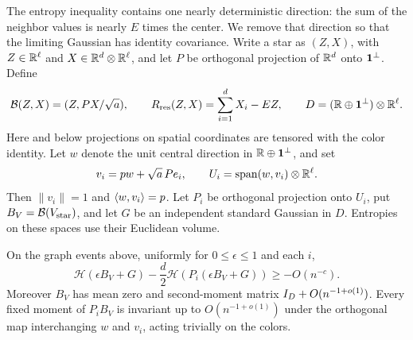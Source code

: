 The entropy inequality contains one nearly deterministic direction:
the sum of the neighbor values is nearly \(E\) times the center.
We remove that direction so that the limiting Gaussian has identity
covariance. Write a star as \((Z,X)\), with
\(Z\in\mathbb R^\ell\) and \(X\in\mathbb R^d\otimes\mathbb R^\ell\), and let \(P\) be
orthogonal projection of \(\mathbb R^d\) onto \({\bf1}^{\perp}\).
Define
\[
 \mathcal B(Z,X)=(Z,PX/\sqrt a),\qquad
 R_{\rm res}(Z,X)=\sum_{i=1}^dX_i-EZ,\qquad
 D=(\mathbb R\oplus{\bf1}^{\perp})\otimes\mathbb R^\ell.
\]
Here and below projections on spatial coordinates are tensored with
the color identity. Let \(w\) denote the unit central direction in
\(\mathbb R\oplus{\bf1}^{\perp}\), and set
\[
 v_i=pw+\sqrt a\,Pe_i,\qquad
 U_i=\operatorname{span}(w,v_i)\otimes\mathbb R^\ell .
\]
Then \(\|v_i\|=1\) and \(\langle w,v_i\rangle=p\). Let \(P_i\) be orthogonal
projection onto \(U_i\), put \(B_V=\mathcal B(V_{\rm star})\), and
let \(G\) be an independent standard Gaussian in \(D\). Entropies on
these spaces use their Euclidean volume.

\begin{lemma}\label{ent:projected-entropy}
On the graph events above, uniformly for \(0\le\epsilon\le1\) and
each \(i\),
\begin{equation}\label{eq:ent-projected-entropy}
 \mathcal H(\epsilon B_V+G)
       -\frac d2\mathcal H(P_i(\epsilon B_V+G))
 \ge -O(n^{-c}).
\end{equation}
Moreover \(B_V\) has mean zero and second-moment matrix
\(I_D+O(n^{-1+o(1)})\). Every fixed moment of \(P_iB_V\) is
invariant up to \(O(n^{-1+o(1)})\) under the orthogonal map
interchanging \(w\) and \(v_i\), acting trivially on the colors.
\end{lemma}

